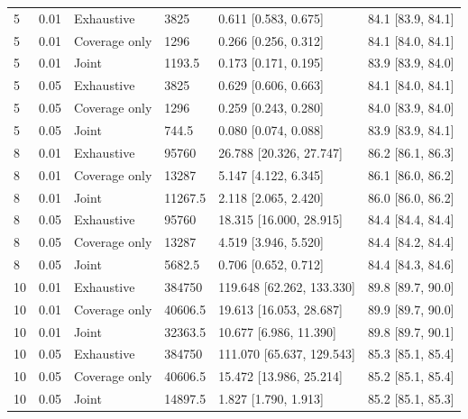\begin{tabular}{llllll}
5 & 0.01 & Exhaustive & 3825 & 0.611 [0.583, 0.675] & 84.1 [83.9, 84.1] \\
5 & 0.01 & Coverage only & 1296 & 0.266 [0.256, 0.312] & 84.1 [84.0, 84.1] \\
5 & 0.01 & Joint & 1193.5 & 0.173 [0.171, 0.195] & 83.9 [83.9, 84.0] \\
5 & 0.05 & Exhaustive & 3825 & 0.629 [0.606, 0.663] & 84.1 [84.0, 84.1] \\
5 & 0.05 & Coverage only & 1296 & 0.259 [0.243, 0.280] & 84.0 [83.9, 84.0] \\
5 & 0.05 & Joint & 744.5 & 0.080 [0.074, 0.088] & 83.9 [83.9, 84.1] \\
8 & 0.01 & Exhaustive & 95760 & 26.788 [20.326, 27.747] & 86.2 [86.1, 86.3] \\
8 & 0.01 & Coverage only & 13287 & 5.147 [4.122, 6.345] & 86.1 [86.0, 86.2] \\
8 & 0.01 & Joint & 11267.5 & 2.118 [2.065, 2.420] & 86.0 [86.0, 86.2] \\
8 & 0.05 & Exhaustive & 95760 & 18.315 [16.000, 28.915] & 84.4 [84.4, 84.4] \\
8 & 0.05 & Coverage only & 13287 & 4.519 [3.946, 5.520] & 84.4 [84.2, 84.4] \\
8 & 0.05 & Joint & 5682.5 & 0.706 [0.652, 0.712] & 84.4 [84.3, 84.6] \\
10 & 0.01 & Exhaustive & 384750 & 119.648 [62.262, 133.330] & 89.8 [89.7, 90.0] \\
10 & 0.01 & Coverage only & 40606.5 & 19.613 [16.053, 28.687] & 89.9 [89.7, 90.0] \\
10 & 0.01 & Joint & 32363.5 & 10.677 [6.986, 11.390] & 89.8 [89.7, 90.1] \\
10 & 0.05 & Exhaustive & 384750 & 111.070 [65.637, 129.543] & 85.3 [85.1, 85.4] \\
10 & 0.05 & Coverage only & 40606.5 & 15.472 [13.986, 25.214] & 85.2 [85.1, 85.4] \\
10 & 0.05 & Joint & 14897.5 & 1.827 [1.790, 1.913] & 85.2 [85.1, 85.3] \\
\end{tabular}
